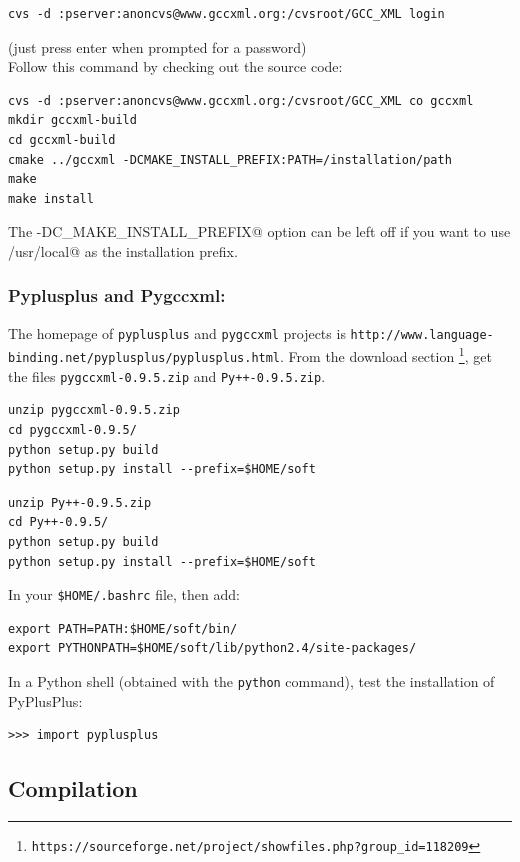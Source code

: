 \documentclass[12pt,a4paper]{article}
\begin{document}
\begin{verbatim}
cvs -d :pserver:anoncvs@www.gccxml.org:/cvsroot/GCC_XML login
\end{verbatim}
(just press enter when prompted for a password)\\
Follow this command by checking out the source code:
\begin{verbatim}
cvs -d :pserver:anoncvs@www.gccxml.org:/cvsroot/GCC_XML co gccxml
mkdir gccxml-build
cd gccxml-build
cmake ../gccxml -DCMAKE_INSTALL_PREFIX:PATH=/installation/path
make
make install
\end{verbatim}
The \verb@-DC_MAKE_INSTALL_PREFIX@ option can be left off if you want to use \verb@/usr/local@ as the installation prefix.


\subsubsection{Pyplusplus and Pygccxml: \label{pyplusplus}}
The homepage of {\tt pyplusplus} and {\tt pygccxml} projects is 
{\tt http://www.language-binding.net/pyplusplus/pyplusplus.html}. From the
download section \footnote{\tt https://sourceforge.net/project/showfiles.php?group\_id=118209}, 
get the files {\tt pygccxml-0.9.5.zip} and {\tt Py++-0.9.5.zip}.

\begin{verbatim}
unzip pygccxml-0.9.5.zip
cd pygccxml-0.9.5/
python setup.py build
python setup.py install --prefix=$HOME/soft
\end{verbatim}

\begin{verbatim}
unzip Py++-0.9.5.zip 
cd Py++-0.9.5/
python setup.py build
python setup.py install --prefix=$HOME/soft
\end{verbatim}

In your {\tt \$HOME/.bashrc} file, then add:
\begin{verbatim}
export PATH=PATH:$HOME/soft/bin/
export PYTHONPATH=$HOME/soft/lib/python2.4/site-packages/
\end{verbatim}

In a Python shell (obtained with the {\tt python} command), test the installation
of PyPlusPlus:
\begin{verbatim}
>>> import pyplusplus
\end{verbatim}






\subsection{Compilation}
\end{document}
